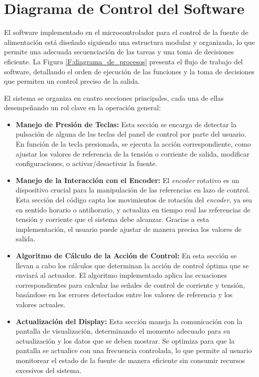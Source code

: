 \section{Diagrama de Control del Software}
El software implementado en el microcontrolador para el control de la fuente de alimentación está diseñado siguiendo una estructura modular y organizada, lo que permite una adecuada secuenciación de las tareas y una toma de decisiones eficiente. La Figura \ref{F:diagrama_de_procesos} presenta el flujo de trabajo del software, detallando el orden de ejecución de las funciones y la toma de decisiones que permiten un control preciso de la salida.\par

El sistema se organiza en cuatro secciones principales, cada una de ellas desempeñando un rol clave en la operación general:\par
\begin{itemize}
    \item \textbf{Manejo de Presión de Teclas:} Esta sección se encarga de detectar la pulsación de alguna de las teclas del panel de control por parte del usuario. En función de la tecla presionada, se ejecuta la acción correspondiente, como ajustar los valores de referencia de la tensión o corriente de salida, modificar configuraciones, o activar/desactivar la fuente.
    \item \textbf{Manejo de la Interacción con el Encoder:} El \textit{encoder} rotativo es un dispositivo crucial para la manipulación de las referencias en lazo de control. Esta sección del código capta los movimientos de rotación del \textit{encoder}, ya sea en sentido horario o antihorario, y actualiza en tiempo real las referencias de tensión y corriente que el sistema debe alcanzar. Gracias a esta implementación, el usuario puede ajustar de manera precisa los valores de salida.
    \item \textbf{Algoritmo de Cálculo de la Acción de Control:} En esta sección se llevan a cabo los cálculos que determinan la acción de control óptima que se enviará al actuador. El algoritmo implementado aplica las ecuaciones correspondientes para calcular las señales de control de corriente y tensión, basándose en los errores detectados entre los valores de referencia y los valores actuales.
    \item \textbf{Actualización del Display:} Esta sección maneja la comunicación con la pantalla de visualización, determinando el momento adecuado para su actualización y los datos que se deben mostrar. Se optimiza para que la pantalla se actualice con una frecuencia controlada, lo que permite al usuario monitorear el estado de la fuente de manera eficiente sin consumir recursos excesivos del sistema.
\end{itemize}

